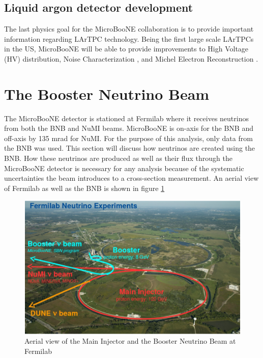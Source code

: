 \subsection{Liquid argon detector development}
The last physics goal for the MicroBooNE collaboration is to provide important information regarding LArTPC technology. Being the first large scale LArTPCs in the US, MicroBooNE will be able to provide improvements to High Voltage (HV) distribution, Noise Characterization \cite{noisechar}, and Michel Electron Reconstruction \cite{michel}. 

\section{The Booster Neutrino Beam}
The MicroBooNE detector is stationed at Fermilab where it receives neutrinos from both the BNB and NuMI beams. MicroBooNE is on-axis for the BNB and off-axis by 135 mrad for NuMI. For the purpose of this analysis, only data from the BNB was used. This section will discuss how neutrinos are created using the BNB. How these neutrinos are produced as well as their flux through the MicroBooNE detector is necessary for any analysis because of the systematic uncertainties the beam introduces to a cross-section measurement. An aerial view of Fermilab as well as the BNB is shown in figure \ref{fig:fnal}

\begin{figure}[htp!]
\centering
\includegraphics[width=\textwidth]{figs/fnal.png}
\caption{Aerial view of the Main Injector and the Booster Neutrino Beam at Fermilab}
\label{fig:fnal}
\end{figure}

